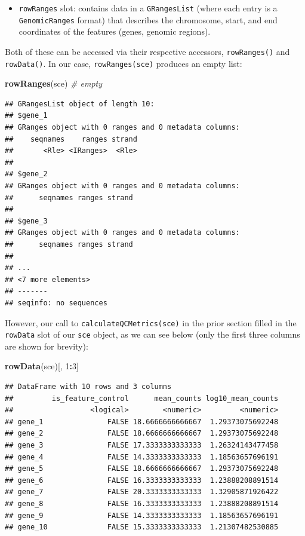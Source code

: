 \documentclass[]{book}
\newenvironment{Shaded}{\begin{snugshade}}{\end{snugshade}}
\newcommand{\CommentTok}[1]{\textcolor[rgb]{0.56,0.35,0.01}{\textit{#1}}}
\newcommand{\DecValTok}[1]{\textcolor[rgb]{0.00,0.00,0.81}{#1}}
\newcommand{\KeywordTok}[1]{\textcolor[rgb]{0.13,0.29,0.53}{\textbf{#1}}}
\newcommand{\NormalTok}[1]{#1}
\newcommand{\OperatorTok}[1]{\textcolor[rgb]{0.81,0.36,0.00}{\textbf{#1}}}
\providecommand{\tightlist}{%
  \setlength{\itemsep}{0pt}\setlength{\parskip}{0pt}}
\begin{document}
\begin{itemize}
\tightlist
\item
  \texttt{rowRanges} slot: contains data in a \texttt{GRangesList} (where each entry is a \texttt{GenomicRanges} format) that describes the chromosome, start, and end coordinates of the features (genes, genomic regions).
\end{itemize}

Both of these can be accessed via their respective accessors, \texttt{rowRanges()} and \texttt{rowData()}. In our case, \texttt{rowRanges(sce)} produces an empty list:

\begin{Shaded}
\begin{Highlighting}[]
\KeywordTok{rowRanges}\NormalTok{(sce) }\CommentTok{# empty}
\end{Highlighting}
\end{Shaded}

\begin{verbatim}
## GRangesList object of length 10:
## $gene_1 
## GRanges object with 0 ranges and 0 metadata columns:
##    seqnames    ranges strand
##       <Rle> <IRanges>  <Rle>
## 
## $gene_2 
## GRanges object with 0 ranges and 0 metadata columns:
##      seqnames ranges strand
## 
## $gene_3 
## GRanges object with 0 ranges and 0 metadata columns:
##      seqnames ranges strand
## 
## ...
## <7 more elements>
## -------
## seqinfo: no sequences
\end{verbatim}

However, our call to \texttt{calculateQCMetrics(sce)} in the prior section filled in the \texttt{rowData} slot of our \texttt{sce} object, as we can see below (only the first three columns are shown for brevity):

\begin{Shaded}
\begin{Highlighting}[]
\KeywordTok{rowData}\NormalTok{(sce)[, }\DecValTok{1}\OperatorTok{:}\DecValTok{3}\NormalTok{]}
\end{Highlighting}
\end{Shaded}

\begin{verbatim}
## DataFrame with 10 rows and 3 columns
##         is_feature_control      mean_counts log10_mean_counts
##                  <logical>        <numeric>         <numeric>
## gene_1               FALSE 18.6666666666667  1.29373075692248
## gene_2               FALSE 18.6666666666667  1.29373075692248
## gene_3               FALSE 17.3333333333333  1.26324143477458
## gene_4               FALSE 14.3333333333333  1.18563657696191
## gene_5               FALSE 18.6666666666667  1.29373075692248
## gene_6               FALSE 16.3333333333333  1.23888208891514
## gene_7               FALSE 20.3333333333333  1.32905871926422
## gene_8               FALSE 16.3333333333333  1.23888208891514
## gene_9               FALSE 14.3333333333333  1.18563657696191
## gene_10              FALSE 15.3333333333333  1.21307482530885
\end{verbatim}
\end{document}
